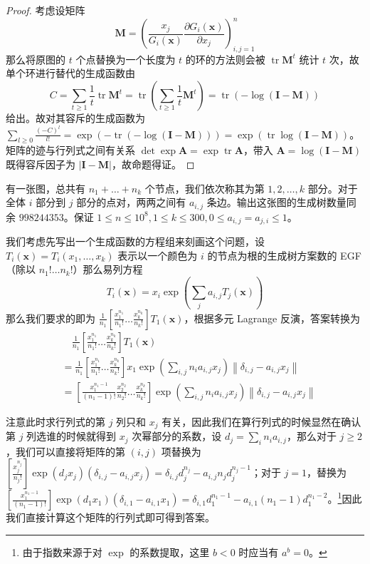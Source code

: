 \begin{proof}
考虑设矩阵
$$
\mathbf M = \left(\frac{x_j}{G_i(\mathbf x)} \frac{\partial G_i (\mathbf x)}{\partial x_j}\right)_{i,j=1}^n
$$
那么将原图的 $t$ 个点替换为一个长度为 $t$ 的环的方法则会被 $\operatorname{tr} \mathbf M^t$ 统计 $t$ 次，故单个环进行替代的生成函数由
$$
C = \sum_{t\ge 1} \frac 1t\operatorname{tr} \mathbf M^t = \operatorname{tr}\left(\sum_{t\ge 1} \frac 1t\mathbf M^t\right) = \operatorname{tr} \left(-\log (\mathbf{I-M})\right)
$$
给出。故对其容斥的生成函数为 $\sum_{l\ge 0} \frac{(-C)^l}{l!}=\exp \left(-\operatorname{tr} \left(-\log (\mathbf{I-M})\right)\right) = \exp \left(\operatorname{tr} \log (\mathbf{I-M})\right)$。矩阵的迹与行列式之间有关系 $\det \exp \mathbf A = \exp \operatorname{tr} \mathbf A$，带入 $\mathbf A = \log (\mathbf{I-M})$ 既得容斥因子为 $|\mathbf{I-M}|$，故命题得证。
\end{proof}

\begin{problem}
有一张图，总共有 $n_1+\dots+n_k$ 个节点，我们依次称其为第 $1,2,\dots,k$ 部分。对于全体 $i$ 部分到 $j$ 部分的点对，两两之间有 $a_{i,j}$ 条边。输出这张图的生成树数量同余 $998244353$。保证 $1\le n\le 10^8, 1\le k\le 300, 0\le a_{i,j}=a_{j,i}\le 1$。
\end{problem}

\begin{solution}
我们考虑先写出一个生成函数的方程组来刻画这个问题，设 $T_i(\mathbf x)=T_i(x_1,\dots,x_k)$ 表示以一个颜色为 $i$ 的节点为根的生成树方案数的 EGF（除以 $n_1!\dots n_k!$）那么易列方程
$$
T_i(\mathbf x)=x_i \exp \left(\sum_j a_{i,j} T_j(\mathbf x) \right)
$$
那么我们要求的即为 $\frac 1{n_1}\left[\frac{x_1^{n_1}}{n_1!}\dots\frac{x_k^{n_k}}{n_k!}\right] T_1(\mathbf x)$，根据多元 Lagrange 反演，答案转换为
\begin{align*}
&\quad\frac 1{n_1}\left[\frac{x_1^{n_1}}{n_1!}\dots\frac{x_k^{n_k}}{n_k!}\right] T_1(\mathbf x)\\
&= \frac 1{n_1}\left[\frac{x_1^{n_1}}{n_1!}\dots\frac{x_k^{n_k}}{n_k!}\right] x_1\exp\left(\sum_{i,j} n_ia_{i,j}x_j\right) \left \| \delta_{i,j}-a_{i,j}x_j \right\|\\
&= \left[\frac{x_1^{n_1-1}}{(n_1-1)!}\frac{x_2^{n_2}}{n_2!}\dots\frac{x_k^{n_k}}{n_k!}\right] \exp\left(\sum_{i,j} n_ia_{i,j}x_j\right) \left \| \delta_{i,j}-a_{i,j}x_j \right\|
\end{align*}

注意此时求行列式的第 $j$ 列只和 $x_j$ 有关，因此我们在算行列式的时候显然在确认第 $j$ 列选谁的时候就得到 $x_j$ 次幂部分的系数，设 $d_j=\sum_i n_ia_{i,j}$，那么对于 $j\ge 2$，我们可以直接将矩阵的第 $(i,j)$ 项替换为 $\left[\frac{x_j^{n_j}}{n_j!}\right] \exp (d_jx_j)(\delta_{i,j} - a_{i,j}x_j) = \delta_{i,j} d_j^{n_j} - a_{i,j} n_j d_j^{n_j-1}$；对于 $j=1$，替换为 $\left[\frac{x_1^{n_1-1}}{(n_1-1)!}\right] \exp (d_1x_1)(\delta_{i,1} - a_{i,1}x_1) = \delta_{i,1} d_1^{n_1-1} - a_{i,1} (n_1-1) d_1^{n_1-2}$。\footnote{由于指数来源于对 $\exp$ 的系数提取，这里 $b<0$ 时应当有 $a^b=0$。}因此我们直接计算这个矩阵的行列式即可得到答案。
\end{solution}

